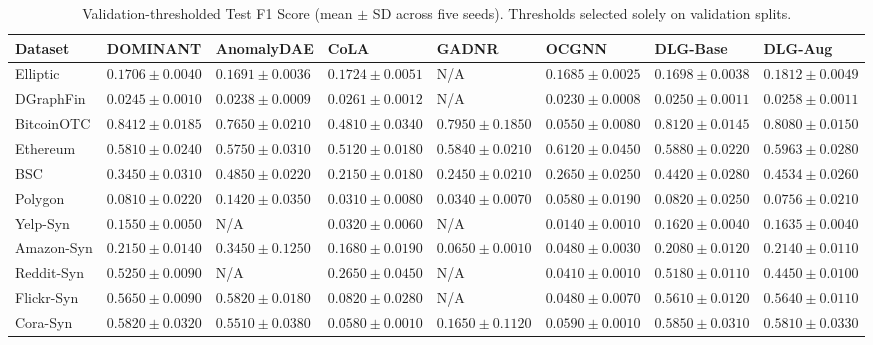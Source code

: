 \documentclass[11pt,a4paper]{article}
\begin{document}
\begin{table}[H]
\centering\scriptsize\setlength{\tabcolsep}{1.5pt}
\caption{Validation-thresholded Test F1 Score (mean $\pm$ SD across five seeds). Thresholds selected solely on validation splits.}
\label{tab:app_f1_full}
\begin{tabularx}{\textwidth}{lXXXXXXX}\toprule
\textbf{Dataset} & \textbf{DOMINANT} & \textbf{AnomalyDAE} & \textbf{CoLA} & \textbf{GADNR} & \textbf{OCGNN} & \textbf{DLG-Base} & \textbf{DLG-Aug} \\\midrule
Elliptic & $0.1706 \pm 0.0040$ & $0.1691 \pm 0.0036$ & $0.1724 \pm 0.0051$ & N/A & $0.1685 \pm 0.0025$ & $0.1698 \pm 0.0038$ & $\mathbf{0.1812 \pm 0.0049}$ \\
DGraphFin & $0.0245 \pm 0.0010$ & $0.0238 \pm 0.0009$ & $\mathbf{0.0261 \pm 0.0012}$ & N/A & $0.0230 \pm 0.0008$ & $0.0250 \pm 0.0011$ & $0.0258 \pm 0.0011$ \\
BitcoinOTC & $\mathbf{0.8412 \pm 0.0185}$ & $0.7650 \pm 0.0210$ & $0.4810 \pm 0.0340$ & $0.7950 \pm 0.1850$ & $0.0550 \pm 0.0080$ & $0.8120 \pm 0.0145$ & $0.8080 \pm 0.0150$ \\
Ethereum & $0.5810 \pm 0.0240$ & $0.5750 \pm 0.0310$ & $0.5120 \pm 0.0180$ & $0.5840 \pm 0.0210$ & $\mathbf{0.6120 \pm 0.0450}$ & $0.5880 \pm 0.0220$ & $0.5963 \pm 0.0280$ \\
BSC & $0.3450 \pm 0.0310$ & $\mathbf{0.4850 \pm 0.0220}$ & $0.2150 \pm 0.0180$ & $0.2450 \pm 0.0210$ & $0.2650 \pm 0.0250$ & $0.4420 \pm 0.0280$ & $0.4534 \pm 0.0260$ \\
Polygon & $0.0810 \pm 0.0220$ & $\mathbf{0.1420 \pm 0.0350}$ & $0.0310 \pm 0.0080$ & $0.0340 \pm 0.0070$ & $0.0580 \pm 0.0190$ & $0.0820 \pm 0.0250$ & $0.0756 \pm 0.0210$ \\
Yelp-Syn & $0.1550 \pm 0.0050$ & N/A & $0.0320 \pm 0.0060$ & N/A & $0.0140 \pm 0.0010$ & $0.1620 \pm 0.0040$ & $\mathbf{0.1635 \pm 0.0040}$ \\
Amazon-Syn & $0.2150 \pm 0.0140$ & $\mathbf{0.3450 \pm 0.1250}$ & $0.1680 \pm 0.0190$ & $0.0650 \pm 0.0010$ & $0.0480 \pm 0.0030$ & $0.2080 \pm 0.0120$ & $0.2140 \pm 0.0110$ \\
Reddit-Syn & $\mathbf{0.5250 \pm 0.0090}$ & N/A & $0.2650 \pm 0.0450$ & N/A & $0.0410 \pm 0.0010$ & $0.5180 \pm 0.0110$ & $0.4450 \pm 0.0100$ \\
Flickr-Syn & $0.5650 \pm 0.0090$ & $\mathbf{0.5820 \pm 0.0180}$ & $0.0820 \pm 0.0280$ & N/A & $0.0480 \pm 0.0070$ & $0.5610 \pm 0.0120$ & $0.5640 \pm 0.0110$ \\
Cora-Syn & $0.5820 \pm 0.0320$ & $0.5510 \pm 0.0380$ & $0.0580 \pm 0.0010$ & $0.1650 \pm 0.1120$ & $0.0590 \pm 0.0010$ & $\mathbf{0.5850 \pm 0.0310}$ & $0.5810 \pm 0.0330$ \\

\end{tabularx}
\end{table}
\end{document}
